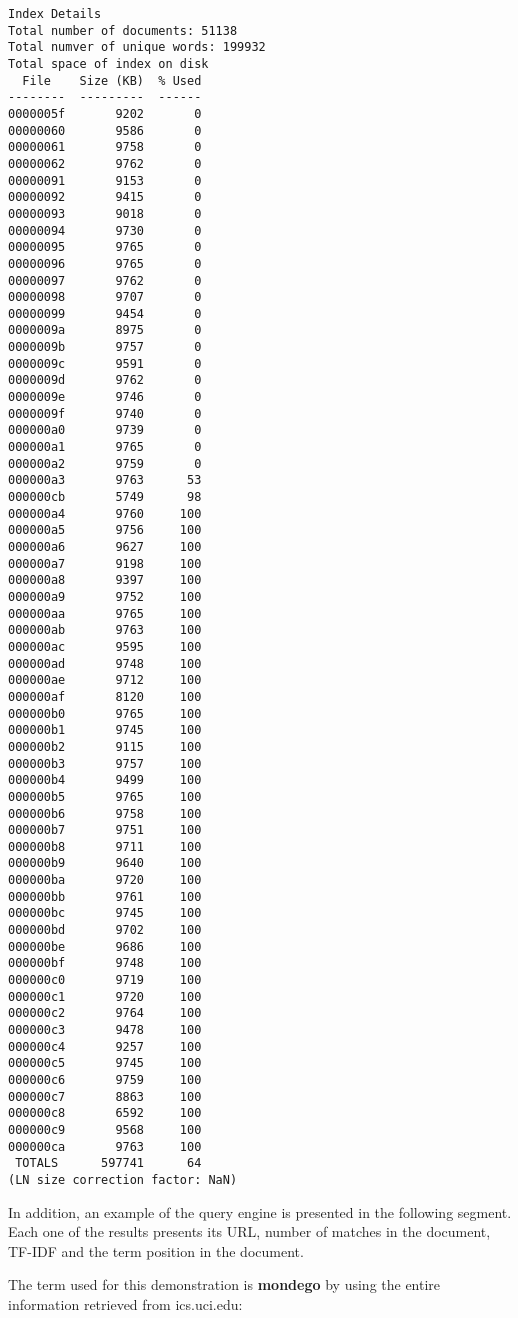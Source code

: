 \documentclass[paper=a4, fontsize=11pt]{scrartcl} %
\numberwithin{equation}{section} %
\numberwithin{table}{section} %
\begin{document}
\begin{verbatim}
Index Details
Total number of documents: 51138
Total numver of unique words: 199932
Total space of index on disk
  File    Size (KB)  % Used
--------  ---------  ------
0000005f       9202       0
00000060       9586       0
00000061       9758       0
00000062       9762       0
00000091       9153       0
00000092       9415       0
00000093       9018       0
00000094       9730       0
00000095       9765       0
00000096       9765       0
00000097       9762       0
00000098       9707       0
00000099       9454       0
0000009a       8975       0
0000009b       9757       0
0000009c       9591       0
0000009d       9762       0
0000009e       9746       0
0000009f       9740       0
000000a0       9739       0
000000a1       9765       0
000000a2       9759       0
000000a3       9763      53
000000cb       5749      98
000000a4       9760     100
000000a5       9756     100
000000a6       9627     100
000000a7       9198     100
000000a8       9397     100
000000a9       9752     100
000000aa       9765     100
000000ab       9763     100
000000ac       9595     100
000000ad       9748     100
000000ae       9712     100
000000af       8120     100
000000b0       9765     100
000000b1       9745     100
000000b2       9115     100
000000b3       9757     100
000000b4       9499     100
000000b5       9765     100
000000b6       9758     100
000000b7       9751     100
000000b8       9711     100
000000b9       9640     100
000000ba       9720     100
000000bb       9761     100
000000bc       9745     100
000000bd       9702     100
000000be       9686     100
000000bf       9748     100
000000c0       9719     100
000000c1       9720     100
000000c2       9764     100
000000c3       9478     100
000000c4       9257     100
000000c5       9745     100
000000c6       9759     100
000000c7       8863     100
000000c8       6592     100
000000c9       9568     100
000000ca       9763     100
 TOTALS      597741      64
(LN size correction factor: NaN)
\end{verbatim}
\newpage
In addition, an example of the query engine is presented in the following segment. Each one of the results presents its URL, number of matches in the document, TF-IDF and the term position in the document.

The term used for this demonstration is \textbf{mondego} by using the entire information retrieved from ics.uci.edu:
\end{document}
